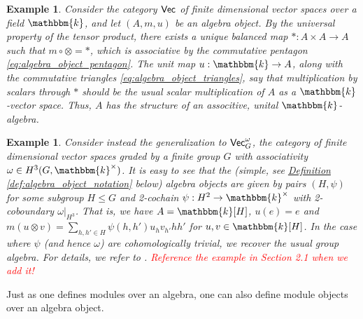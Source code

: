 \documentclass[12pt, reqno]{amsart}
\numberwithin{equation}{section}
\theoremstyle{plainspace}
\theoremstyle{definitionspace}
\newtheorem{example}[theorem]{Example}
\theoremstyle{remarkspace}
\newcommand{\textcat}[1]{\textup{\textsf{#1}}}
\begin{document}
\begin{example}\label{ex:algebra_object_vect}
Consider the category $\textcat{Vec}$ of finite dimensional vector spaces over a field $\mathbbm{k}$, and let $(A, m, u)$ be an algebra object. By the universal property of the tensor product, there exists a unique balanced map $* : A \times A \to A$ such that $m \circ \otimes = *$, which is associative by the commutative pentagon \ref{eq:algebra_object_pentagon}. The unit map $u : \mathbbm{k} \to A$, along with the commutative triangles \ref{eq:algebra_object_triangles}, say that multiplication by scalars through $*$ should be the usual scalar multiplication of $A$ as a $\mathbbm{k}$-vector space. Thus, $A$ has the structure of an associtive, unital $\mathbbm{k}$-algebra.
\end{example}
\leavevmode

\begin{example}\label{ex:algebra_object_graded_vect}
Consider instead the generalization to $\textcat{Vec}_G^{\omega}$, the category of finite dimensional vector spaces graded by a finite group $G$ with associativity $\omega \in H^3(G, \mathbbm{k}^{\times})$. It is easy to see that the (simple, see \hyperref[def:algebra_object_notation]{Definition \ref*{def:algebra_object_notation}} below) algebra objects are given by pairs $(H, \psi)$ for some subgroup $H \leq G$ and 2-cochain $\psi : H^2 \to \mathbbm{k}^{\times}$ with 2-coboundary $\omega|_{H^3}$. That is, we have $A = \mathbbm{k}[H]$, $u(e) = e$ and $m(u \otimes v) = \sum_{h, h' \in H}{\psi(h, h')u_h v_{h'} hh'}$ for $u, v \in \mathbbm{k}[H]$. In the case where $\psi$ (and hence $\omega$) are cohomologically trivial, we recover the usual group algebra. For details, we refer to \cite[Example 9.7.2]{Etingof_2016}. \textcolor{red}{Reference the example in Section 2.1 when we add it!}
\end{example}
\leavevmode

\noindent Just as one defines modules over an algebra, one can also define module objects over an algebra object.
\newline
\end{document}
